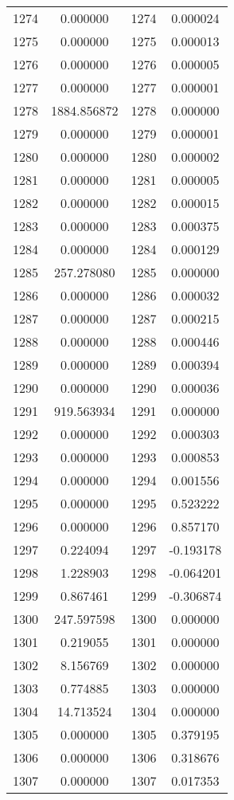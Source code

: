 \documentclass[12pt]{article}
\begin{document}
\begin{longtable}{@{}cccc@{}}
1274 & 0.000000 & 1274 & 0.000024 \\
1275 & 0.000000 & 1275 & 0.000013 \\
1276 & 0.000000 & 1276 & 0.000005 \\
1277 & 0.000000 & 1277 & 0.000001 \\
1278 & 1884.856872 & 1278 & 0.000000 \\
1279 & 0.000000 & 1279 & 0.000001 \\
1280 & 0.000000 & 1280 & 0.000002 \\
1281 & 0.000000 & 1281 & 0.000005 \\
1282 & 0.000000 & 1282 & 0.000015 \\
1283 & 0.000000 & 1283 & 0.000375 \\
1284 & 0.000000 & 1284 & 0.000129 \\
1285 & 257.278080 & 1285 & 0.000000 \\
1286 & 0.000000 & 1286 & 0.000032 \\
1287 & 0.000000 & 1287 & 0.000215 \\
1288 & 0.000000 & 1288 & 0.000446 \\
1289 & 0.000000 & 1289 & 0.000394 \\
1290 & 0.000000 & 1290 & 0.000036 \\
1291 & 919.563934 & 1291 & 0.000000 \\
1292 & 0.000000 & 1292 & 0.000303 \\
1293 & 0.000000 & 1293 & 0.000853 \\
1294 & 0.000000 & 1294 & 0.001556 \\
1295 & 0.000000 & 1295 & 0.523222 \\
1296 & 0.000000 & 1296 & 0.857170 \\
1297 & 0.224094 & 1297 & -0.193178 \\
1298 & 1.228903 & 1298 & -0.064201 \\
1299 & 0.867461 & 1299 & -0.306874 \\
1300 & 247.597598 & 1300 & 0.000000 \\
1301 & 0.219055 & 1301 & 0.000000 \\
1302 & 8.156769 & 1302 & 0.000000 \\
1303 & 0.774885 & 1303 & 0.000000 \\
1304 & 14.713524 & 1304 & 0.000000 \\
1305 & 0.000000 & 1305 & 0.379195 \\
1306 & 0.000000 & 1306 & 0.318676 \\
1307 & 0.000000 & 1307 & 0.017353 \\

\end{longtable}
\end{document}
